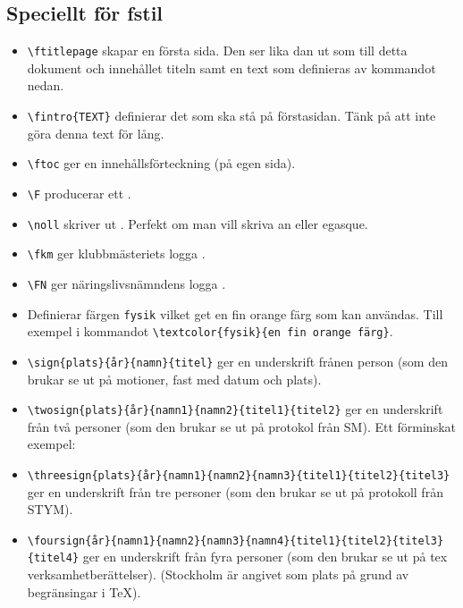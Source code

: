 \documentclass[a4paper]{article}
\newcommand{\bs}{\textbackslash}
\begin{document}
\subsection{Speciellt för fstil}
\begin{itemize}
\item \texttt{\bs ftitlepage} skapar en första sida. Den ser lika dan ut som till detta dokument och innehållet titeln samt en text som definieras av kommandot nedan.
\item \texttt{\bs fintro\{TEXT\}} definierar det som ska stå på förstasidan. Tänk på att inte göra denna text för lång.
\item \texttt{\bs ftoc} ger en innehållsförteckning (på egen sida).
\item \texttt{\bs F} producerar ett \F.
\item \texttt{\bs noll} skriver ut \noll. Perfekt om man vill skriva \noll an eller \noll egasque.
\item \texttt{\bs fkm} ger klubbmästeriets logga \fkm.
\item \texttt{\bs FN} ger näringslivsnämndens logga \FN.
\item Definierar färgen \texttt{fysik} vilket get \textcolor{fysik}{en fin orange färg} som kan användas. Till exempel i kommandot \texttt{\bs textcolor\{fysik\}\{en fin orange färg\}}.
\item \texttt{\bs sign\{plats\}\{år\}\{namn\}\{titel\}} ger en underskrift frånen person (som den brukar se ut på motioner, fast med datum och plats).
\item \texttt{\bs twosign\{plats\}\{år\}\{namn1\}\{namn2\}\{titel1\}\{titel2\}} ger en underskrift från två personer (som den brukar se ut på protokol från SM). Ett förminskat exempel: {\footnotesize
{}
}
\item \texttt{\bs threesign\{plats\}\{år\}\{namn1\}\{namn2\}\{namn3\}\{titel1\}\{titel2\}\{titel3\}} ger en underskrift från tre personer (som den brukar se ut på protokoll från STYM).
\item \texttt{\bs foursign\{år\}\{namn1\}\{namn2\}\{namn3\}\{namn4\}\{titel1\}\{titel2\}\{titel3\}\{titel4\}} ger en underskrift från fyra personer (som den brukar se ut på tex verksamhetberättelser). (Stockholm är angivet som plats på grund av begränsingar i \TeX).
\end{itemize}
\end{document}
